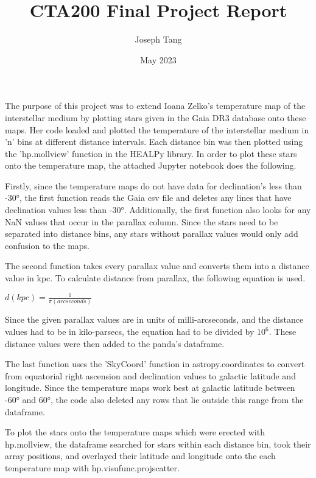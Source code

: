 \documentclass{article}
\title{CTA200 Final Project Report}
\author{Joseph Tang}
\date{May 2023}
\begin{document}
\maketitle

\setlength\parindent{24pt}     
The purpose of this project was to extend Ioana Zelko's temperature map of the interstellar medium by plotting stars given in the Gaia DR3 database onto these maps. Her code loaded and plotted the temperature of the interstellar medium in 'n' bins at different distance intervals. Each distance bin was then plotted using the 'hp.mollview' function in the HEALPy library. In order to plot these stars onto the temperature map, the attached Jupyter notebook does the following.\par

Firstly, since the temperature maps do not have data for declination's less than -30°, the first function reads the Gaia csv file and deletes any lines that have declination values less than -30°. Additionally, the first function also looks for any NaN values that occur in the parallax column. Since the stars need to be separated into distance bins, any stars without parallax values would only add confusion to the maps. \par

The second function takes every parallax value and converts them into a distance value in kpc. To calculate distance from parallax, the following equation is used. 
\begin{center}
    $d (kpc) = \frac{1}{\pi (arcseconds)}$
\end{center}
Since the given parallax values are in units of milli-arcseconds, and the distance values had to be in kilo-parsecs, the equation had to be divided by $10^{6}$. These distance values were then added to the panda's dataframe. \par

The last function uses the 'SkyCoord' function in astropy.coordinates to convert from equatorial right ascension and declination values to galactic latitude and longitude. Since the temperature maps work best at galactic latitude between -60° and 60°, the code also deleted any rows that lie outside this range from the dataframe. \par

To plot the stars onto the temperature maps which were erected with hp.mollview, the dataframe searched for stars within each distance bin, took their array positions, and overlayed their latitude and longitude onto the each temperature map with hp.visufunc.projscatter. \par
\end{document}
